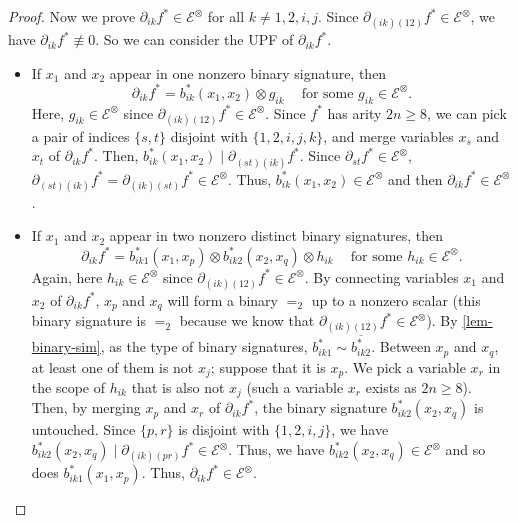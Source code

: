 \begin{proof}
Now we prove ${\partial}_{ik}{f^{\ast}}\in {\mathcal{E}}^{\otimes}$ for all $k\neq 1, 2, i, j$. 
Since ${\partial}_{(ik)(12)}{f^{\ast}}\in \mathcal{E}^{\otimes}$,
we have  ${\partial}_{ik}{f^{\ast}}\not\equiv 0$. 
So we can consider the UPF
of ${\partial}_{ik}{f^{\ast}}$. 
\begin{itemize}
    \item 
If $x_1$ and $x_2$ appear in one nonzero binary signature, then  $${\partial}_{ik}{f^{\ast}}={b^\ast_{ik}}(x_1, x_2)\otimes {g_{ik}} ~~~~\text{ for some } {g_{ik}}\in \mathcal{E}^{\otimes}.$$ 
Here, ${g_{ik}}\in \mathcal{E}^{\otimes}$
since ${\partial}_{(ik)(12)}{f^{\ast}}
\in \mathcal{E}^{\otimes}$.
Since ${f^\ast}$ has arity $2n \geqslant 8$,
we can pick a pair of indices $\{s, t\}$ disjoint with $\{1, 2, i, j, k\}$, and merge variables $x_s$ and $x_t$ of ${\partial}_{ik}{f^{\ast}}$.
Then, ${b^\ast_{ik}}(x_1, x_2)\mid {\partial}_{(st)(ik)}{f^{\ast}}.$
Since ${\partial}_{st}{f^{\ast}}\in \mathcal{E}^{\otimes}$,
${\partial}_{(st)(ik)}{f^{\ast}}={\partial}_{(ik)(st)}{f^{\ast}}\in {\mathcal{E}}^{\otimes}$. Thus, ${b^\ast_{ik}}(x_1, x_2) \in {\mathcal{E}}^{\otimes}$ and then ${\partial}_{ik}{f^{\ast}}\in {\mathcal{E}}^{\otimes}$.
\item    If $x_1$ and $x_2$ appear in two nonzero distinct binary signatures,
then $${\partial}_{ik}{f^{\ast}}={b^\ast_{ik1}}(x_1, x_p)\otimes {b^\ast_{ik2}}(x_2, x_q)\otimes{h_{ik}} ~~~~\text{ for some } {h_{ik}} \in \mathcal{E}^{\otimes}.$$
Again, here ${h_{ik}} \in \mathcal{E}^{\otimes}$
since ${\partial}_{(ik)(12)}{f^{\ast}}
\in \mathcal{E}^{\otimes}$.
By connecting variables $x_1$ and $x_2$ of ${\partial}_{ik}{f^{\ast}}$, $x_p$ and $x_q$ will form a binary $=_2$ up to a nonzero scalar
(this binary signature is $=_2$
because we know that
 ${\partial}_{(ik)(12)}{f^{\ast}}\in \mathcal{E}^{\otimes}$).
By \cref{lem-binary-sim}, 
as the type of binary signatures,
${{b^\ast_{ik1}}} \sim \overline{b^\ast_{ik2}}.$
Between $x_p$ and $x_q$, at least one of them is not $x_j$; suppose that it is $x_p$. 
We pick a variable $x_r$ in the scope of ${h_{ik}}$ that is also not $x_j$ (such a  variable $x_r$  exists as $2n \geqslant 8$). Then, by merging $x_p$ and $x_r$ of ${\partial}_{ik}{f^{\ast}}$, 
the binary signature ${b^\ast_{ik2}}(x_2, x_q)$ is untouched. 
Since $\{p, r\}$ is disjoint with $\{1, 2, i, j\}$, we have ${b^\ast_{ik2}}(x_2, x_q)\mid {\partial}_{(ik)(pr)}{f^{\ast}}\in {\mathcal{E}}^{\otimes}$. Thus, we have ${b^\ast_{ik2}}(x_2, x_q)
\in {\mathcal{E}}^{\otimes}$ and so does
${{b^\ast_{ik1}}}(x_1, x_p)$. 
Thus, ${\partial}_{ik}{f^{\ast}}\in {\mathcal{E}}^{\otimes}$.
    \end{itemize}
   

\end{proof}
